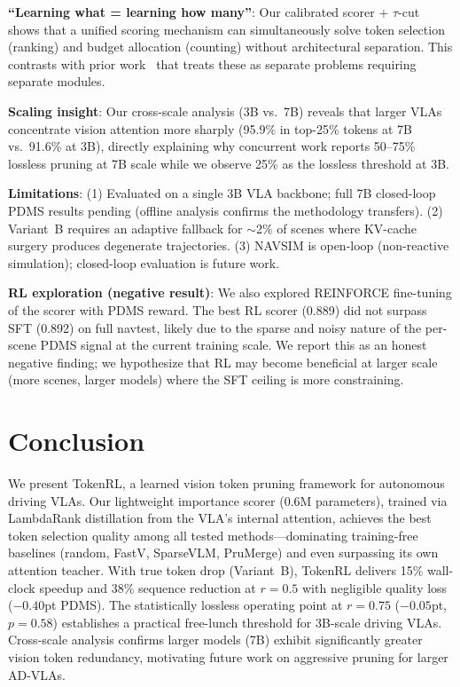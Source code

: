 \documentclass[letterpaper]{article} %
\newcommand{\ours}{TokenRL}
\begin{document}
\textbf{``Learning what = learning how many''}: Our calibrated scorer + $\tau$-cut shows that a unified scoring mechanism can simultaneously solve token selection (ranking) and budget allocation (counting) without architectural separation.
This contrasts with prior work~\citep{prune2drive2026,mvpruner2026} that treats these as separate problems requiring separate modules.

\textbf{Scaling insight}: Our cross-scale analysis (3B vs.\ 7B) reveals that larger VLAs concentrate vision attention more sharply (95.9\% in top-25\% tokens at 7B vs.\ 91.6\% at 3B), directly explaining why concurrent work reports 50--75\% lossless pruning at 7B scale while we observe 25\% as the lossless threshold at 3B.

\textbf{Limitations}:
(1) Evaluated on a single 3B VLA backbone; full 7B closed-loop PDMS results pending (offline analysis confirms the methodology transfers).
(2) Variant~B requires an adaptive fallback for ${\sim}$2\% of scenes where KV-cache surgery produces degenerate trajectories.
(3) NAVSIM is open-loop (non-reactive simulation); closed-loop evaluation is future work.

\textbf{RL exploration (negative result)}:
We also explored REINFORCE fine-tuning of the scorer with PDMS reward.
The best RL scorer (0.889) did not surpass SFT (0.892) on full navtest, likely due to the sparse and noisy nature of the per-scene PDMS signal at the current training scale.
We report this as an honest negative finding; we hypothesize that RL may become beneficial at larger scale (more scenes, larger models) where the SFT ceiling is more constraining.

\section{Conclusion}
\label{sec:conclusion}

We present \ours{}, a learned vision token pruning framework for autonomous driving VLAs.
Our lightweight importance scorer (0.6M parameters), trained via LambdaRank distillation from the VLA's internal attention, achieves the best token selection quality among all tested methods---dominating training-free baselines (random, FastV, SparseVLM, PruMerge) and even surpassing its own attention teacher.
With true token drop (Variant~B), \ours{} delivers 15\% wall-clock speedup and 38\% sequence reduction at $r{=}0.5$ with negligible quality loss ($-0.40$pt PDMS).
The statistically lossless operating point at $r{=}0.75$ ($-0.05$pt, $p{=}0.58$) establishes a practical free-lunch threshold for 3B-scale driving VLAs.
Cross-scale analysis confirms larger models (7B) exhibit significantly greater vision token redundancy, motivating future work on aggressive pruning for larger AD-VLAs.


\end{document}
